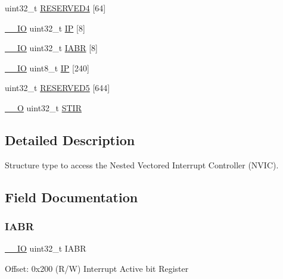 \begin{DoxyCompactItemize}
uint32\+\_\+t \mbox{\hyperlink{struct_n_v_i_c___type_aaed8c9afc755176cd51954c3056cc446}{R\+E\+S\+E\+R\+V\+E\+D4}} \mbox{[}64\mbox{]}
\item 
\mbox{\hyperlink{core__sc300_8h_aec43007d9998a0a0e01faede4133d6be}{\+\_\+\+\_\+\+IO}} uint32\+\_\+t \mbox{\hyperlink{struct_n_v_i_c___type_a519d82311efa6ead6f53b495d3d80de8}{IP}} \mbox{[}8\mbox{]}
\item 
\mbox{\hyperlink{core__sc300_8h_aec43007d9998a0a0e01faede4133d6be}{\+\_\+\+\_\+\+IO}} uint32\+\_\+t \mbox{\hyperlink{struct_n_v_i_c___type_ab61000be19b0293ea14009224fc34fe3}{I\+A\+BR}} \mbox{[}8\mbox{]}
\item 
\mbox{\hyperlink{core__sc300_8h_aec43007d9998a0a0e01faede4133d6be}{\+\_\+\+\_\+\+IO}} uint8\+\_\+t \mbox{\hyperlink{struct_n_v_i_c___type_a38c377984f751265667317981f101bb4}{IP}} \mbox{[}240\mbox{]}
\item 
uint32\+\_\+t \mbox{\hyperlink{struct_n_v_i_c___type_a46aeb40348124934bf802f01806b4f7f}{R\+E\+S\+E\+R\+V\+E\+D5}} \mbox{[}644\mbox{]}
\item 
\mbox{\hyperlink{core__sc300_8h_a7e25d9380f9ef903923964322e71f2f6}{\+\_\+\+\_\+O}} uint32\+\_\+t \mbox{\hyperlink{struct_n_v_i_c___type_a471c399bb79454dcdfb342a31a5684ae}{S\+T\+IR}}
\end{DoxyCompactItemize}


\subsection{Detailed Description}
Structure type to access the Nested Vectored Interrupt Controller (N\+V\+IC). 

\subsection{Field Documentation}
\mbox{\label{struct_n_v_i_c___type_ab61000be19b0293ea14009224fc34fe3}} 
\subsubsection{\texorpdfstring{IABR}{IABR}}
{\footnotesize\ttfamily \mbox{\hyperlink{core__sc300_8h_aec43007d9998a0a0e01faede4133d6be}{\+\_\+\+\_\+\+IO}} uint32\+\_\+t I\+A\+BR}

Offset\+: 0x200 (R/W) Interrupt Active bit Register \mbox{\label{struct_n_v_i_c___type_a5524644c804c18c22addd691d4da53e4}} 
